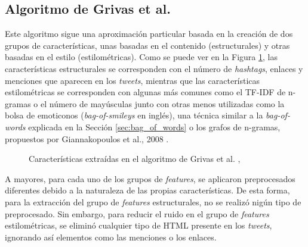 \subsection{Algoritmo de Grivas et al. \cite{grivas2015author}}

Este algoritmo sigue una aproximación particular basada en la creación de dos grupos de características, unas basadas en el contenido (estructurales) y otras basadas en el estilo (estilométricas).
Como se puede ver en la Figura \ref{fig:features_grivas}, las características estructurales se corresponden con el número de \textit{hashtags}, enlaces y menciones que aparecen en los \textit{tweets},
mientras que las características estilométricas se corresponden con algunas más comunes como el TF-IDF de n-gramas o el número de mayúsculas junto con otras menos
utilizadas como la bolsa de emoticonos (\textit{bag-of-smileys} en inglés), una técnica similar a la \textit{bag-of-words} explicada en la Sección \ref{sec:bag_of_words} o los grafos de n-gramas, propuestos
por Giannakopoulos et al., 2008 \cite{giannakopoulos2008summarization}.

\bigskip
\begin{figure}[H]
	\centering
	\caption{Características extraídas en el algoritmo de Grivas et al. \cite{grivas2015author}, }
	\label{fig:features_grivas}
\end{figure}

\bigskip
A mayores, para cada uno de los grupos de \textit{features}, se aplicaron preprocesados diferentes debido a la naturaleza de las propias características. De esta forma, para la extracción del grupo de \textit{features}
estructurales, no se realizó nigún tipo de preprocesado. Sin embargo, para reducir el ruido en el grupo de \textit{features} estilométricas, se eliminó cualquier tipo de HTML presente en los \textit{tweets}, ignorando así
elementos como las menciones o los enlaces.

